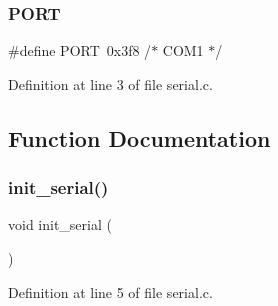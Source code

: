 \subsubsection{\texorpdfstring{P\+O\+RT}{PORT}}
{\footnotesize\ttfamily \#define P\+O\+RT~0x3f8   /$\ast$ C\+O\+M1 $\ast$/}



Definition at line 3 of file serial.\+c.



\subsection{Function Documentation}
\mbox{\label{a00056_acfb6f6d615183fc2f71e79dfbadfe27d_acfb6f6d615183fc2f71e79dfbadfe27d}} 
\subsubsection{\texorpdfstring{init\+\_\+serial()}{init\_serial()}}
{\footnotesize\ttfamily void init\+\_\+serial (\begin{DoxyParamCaption}{ }\end{DoxyParamCaption})}



Definition at line 5 of file serial.\+c.


